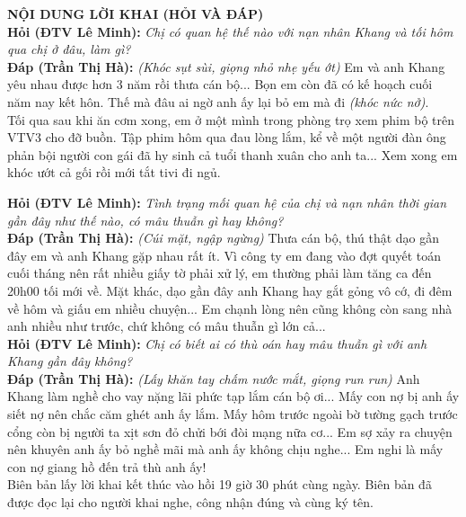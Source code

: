 \documentclass[12pt,a4paper]{article}
\begin{document}
\vspace{0.3cm}\noindent\textbf{\large NỘI DUNG LỜI KHAI (HỎI VÀ ĐÁP)}\\[0.15cm]


\noindent\textbf{Hỏi (ĐTV Lê Minh):} \textit{Chị có quan hệ thế nào với nạn nhân Khang và tối hôm qua chị ở đâu, làm gì?}\\[0.15cm]
\noindent\textbf{Đáp (Trần Thị Hà):} \textit{(Khóc sụt sùi, giọng nhỏ nhẹ yếu ớt)} Em và anh Khang yêu nhau được hơn 3 năm rồi thưa cán bộ... Bọn em còn đã có kế hoạch cuối năm nay kết hôn. Thế mà đâu ai ngờ anh ấy lại bỏ em mà đi \textit{(khóc nức nở)}.\\[0.35cm]
Tối qua sau khi ăn cơm xong, em ở một mình trong phòng trọ xem phim bộ trên VTV3 cho đỡ buồn. Tập phim hôm qua đau lòng lắm, kể về một người đàn ông phản bội người con gái đã hy sinh cả tuổi thanh xuân cho anh ta... Xem xong em khóc ướt cả gối rồi mới tắt tivi đi ngủ.


\noindent\textbf{Hỏi (ĐTV Lê Minh):} \textit{Tình trạng mối quan hệ của chị và nạn nhân thời gian gần đây như thế nào, có mâu thuẫn gì hay không?}\\[0.15cm]
\noindent\textbf{Đáp (Trần Thị Hà):} \textit{(Cúi mặt, ngập ngừng)} Thưa cán bộ, thú thật dạo gần đây em và anh Khang gặp nhau rất ít. Vì công ty em đang vào đợt quyết toán cuối tháng nên rất nhiều giấy tờ phải xử lý, em thường phải làm tăng ca đến 20h00 tối mới về. Mặt khác, dạo gần đây anh Khang hay gắt gỏng vô cớ, đi đêm về hôm và giấu em nhiều chuyện... Em chạnh lòng nên cũng không còn sang nhà anh nhiều như trước, chứ không có mâu thuẫn gì lớn cả...\\[0.35cm]

\noindent\textbf{Hỏi (ĐTV Lê Minh):} \textit{Chị có biết ai có thù oán hay mâu thuẫn gì với anh Khang gần đây không?}\\[0.15cm]
\noindent\textbf{Đáp (Trần Thị Hà):} \textit{(Lấy khăn tay chấm nước mắt, giọng run run)} Anh Khang làm nghề cho vay nặng lãi phức tạp lắm cán bộ ơi... Mấy con nợ bị anh ấy siết nợ nên chắc căm ghét anh ấy lắm. Mấy hôm trước ngoài bờ tường gạch trước cổng còn bị người ta xịt sơn đỏ chửi bới đòi mạng nữa cơ... Em sợ xảy ra chuyện nên khuyên anh ấy bỏ nghề mãi mà anh ấy không chịu nghe... Em nghi là mấy con nợ giang hồ đến trả thù anh ấy!\\[0.35cm]


Biên bản lấy lời khai kết thúc vào hồi 19 giờ 30 phút cùng ngày. Biên bản đã được đọc lại cho người khai nghe, công nhận đúng và cùng ký tên.
\end{document}
